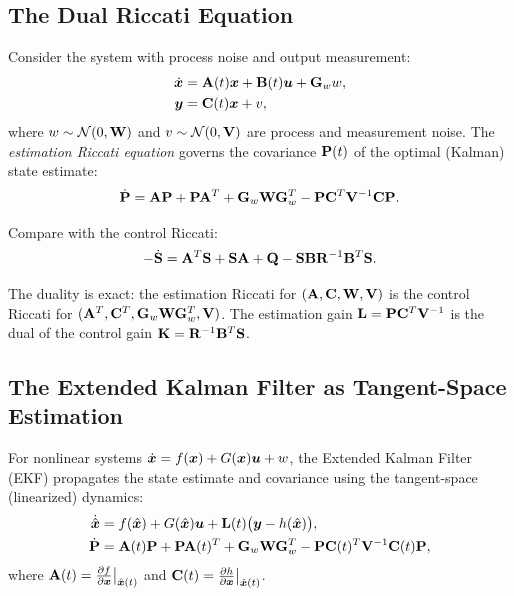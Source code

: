 \subsection{The Dual Riccati Equation}

Consider the system with process noise and output measurement:
\begin{align}
\dot{\bm{x}} &= \mathbf{A}(t)\bm{x} + \mathbf{B}(t)\bm{u} + \mathbf{G}_w w, \label{eq:ch6:process-noise} \\
\bm{y} &= \mathbf{C}(t)\bm{x} + v, \label{eq:ch6:measurement}
\end{align}
where $w \sim \mathcal{N}(0, \mathbf{W})$ and $v \sim \mathcal{N}(0, \mathbf{V})$ are process
and measurement noise. The \emph{estimation Riccati equation} governs the covariance
$\mathbf{P}(t)$ of the optimal (Kalman) state estimate:
\begin{equation}
\dot{\mathbf{P}} = \mathbf{A}\mathbf{P} + \mathbf{P}\mathbf{A}^T + \mathbf{G}_w \mathbf{W} \mathbf{G}_w^T
- \mathbf{P}\mathbf{C}^T \mathbf{V}^{-1} \mathbf{C}\mathbf{P}.
\label{eq:ch6:estimation-riccati}
\end{equation}

Compare with the control Riccati:
\begin{equation}
-\dot{\mathbf{S}} = \mathbf{A}^T\mathbf{S} + \mathbf{S}\mathbf{A} + \mathbf{Q}
- \mathbf{S}\mathbf{B}\mathbf{R}^{-1}\mathbf{B}^T\mathbf{S}.
\label{eq:ch6:control-riccati-recall}
\end{equation}

The duality is exact: the estimation Riccati for $(\mathbf{A}, \mathbf{C}, \mathbf{W}, \mathbf{V})$
is the control Riccati for $(\mathbf{A}^T, \mathbf{C}^T, \mathbf{G}_w \mathbf{W} \mathbf{G}_w^T, \mathbf{V})$.
The estimation gain $\mathbf{L} = \mathbf{P}\mathbf{C}^T\mathbf{V}^{-1}$ is the dual of the control
gain $\mathbf{K} = \mathbf{R}^{-1}\mathbf{B}^T\mathbf{S}$.

\subsection{The Extended Kalman Filter as Tangent-Space Estimation}

For nonlinear systems $\dot{\bm{x}} = f(\bm{x}) + G(\bm{x})\bm{u} + w$, the Extended Kalman Filter (EKF)
propagates the state estimate and covariance using the tangent-space (linearized) dynamics:
\begin{align}
\dot{\hat{\bm{x}}} &= f(\hat{\bm{x}}) + G(\hat{\bm{x}})\bm{u}
+ \mathbf{L}(t)\bigl(\bm{y} - h(\hat{\bm{x}})\bigr), \label{eq:ch6:ekf-state} \\
\dot{\mathbf{P}} &= \mathbf{A}(t)\mathbf{P} + \mathbf{P}\mathbf{A}(t)^T + \mathbf{G}_w \mathbf{W} \mathbf{G}_w^T
- \mathbf{P}\mathbf{C}(t)^T \mathbf{V}^{-1} \mathbf{C}(t)\mathbf{P}, \label{eq:ch6:ekf-cov}
\end{align}
where $\mathbf{A}(t) = \frac{\partial f}{\partial \bm{x}}\big|_{\hat{\bm{x}}(t)}$ and
$\mathbf{C}(t) = \frac{\partial h}{\partial \bm{x}}\big|_{\hat{\bm{x}}(t)}$.

